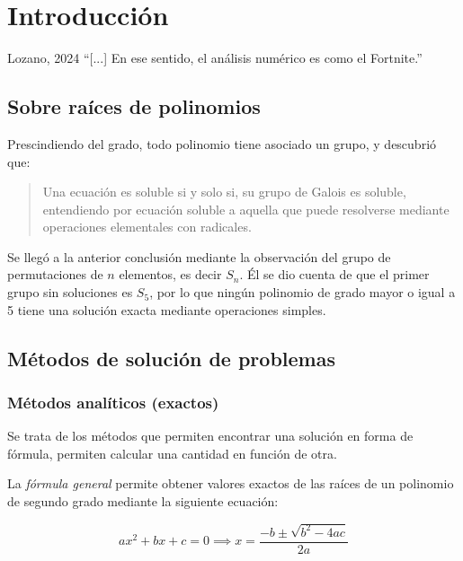 \chapter{Introducción}

\begin{chapquote}{Lozano, 2024}
    ``[...] En ese sentido, el análisis numérico es como el Fortnite.''
\end{chapquote}


\section{Sobre raíces de polinomios}

Prescindiendo del grado, todo polinomio tiene asociado un grupo, y
descubrió que:

\begin{quote}
    Una ecuación es soluble si y solo si, su grupo de Galois es soluble,
    entendiendo por ecuación soluble a aquella que puede resolverse mediante
    operaciones elementales con radicales.
\end{quote}

Se llegó a la anterior conclusión mediante la observación del grupo de
permutaciones de \(n\) elementos, es decir \(S_n\). Él se dio cuenta de que el
primer grupo sin soluciones es \(S_5\), por lo que ningún polinomio de grado
mayor o igual a 5 tiene una solución exacta mediante operaciones simples.

\section{Métodos de solución de problemas}

\subsection{Métodos analíticos (exactos)}

Se trata de los métodos que permiten encontrar una solución en forma de
fórmula, permiten calcular una cantidad en función de otra.

\begin{eg}
    
    La \emph{fórmula general} permite obtener valores exactos de las raíces de
    un polinomio de segundo grado mediante la siguiente ecuación:

    \[
        ax^2 + bx + c = 0 \implies x = \frac{-b \pm \sqrt{b^2 -4ac}}{2a}
    \]
\end{eg}


